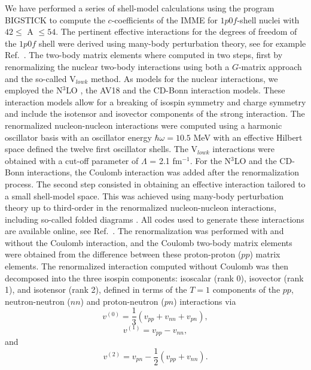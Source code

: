 \documentclass[twocolumn,aps,tightenlines,floatfix,showpacs]{revtex4}
\begin{document}
We have performed a series of shell-model calculations using the
program BIGSTICK to compute the $c$-coefficients of the IMME for
$1p0f$-shell nuclei with $ 42 \le $ A $ \le 54$. The pertinent
effective interactions for the degrees of freedom of the $1p0f$ shell
were derived using many-body perturbation theory, see for example
Ref.~\cite{mhj1995}. The two-body matrix elements where computed in
two steps, first by renormalizing the nuclear two-body interactions
using both a $G$-matrix approach and the so-called V$_{lowk}$
method. As models for the nuclear interactions, we employed the
N$^3$LO \cite{entem2003}, the AV18 \cite{argonne1995} and the CD-Bonn
\cite{cdbonn2001} interaction models. These interaction models allow
for a breaking of isospin symmetry and charge symmetry and include the
isotensor and isovector components of the strong interaction.  The
renormalized nucleon-nucleon interactions were computed using a
harmonic oscillator basis with an oscillator energy $\hbar\omega
=10.5$ MeV with an effective Hilbert space defined the twelve first
oscillator shells. The V$_{lowk}$ interactions were obtained with a
cut-off parameter of $\Lambda$ = 2.1 fm$^{-1}$.  For the N$^3$LO and
the CD-Bonn interactions, the Coulomb interaction was added after the
renormalization process.  The second step consisted in obtaining an
effective interaction tailored to a small shell-model space. This was
achieved using many-body perturbation theory up to third-order in the
renormalized nucleon-nucleon interactions, including so-called folded
diagrams \cite{mhj1995}. All codes used to generate these interactions
are available online, see Ref.~\cite{mhjgit}.  The renormalization was
performed with and without the Coulomb interaction, and the Coulomb
two-body matrix elements were obtained from the difference between
these proton-proton ($pp$) matrix elements. The renormalized
interaction computed without Coulomb was then decomposed into the
three isospin components: isoscalar (rank 0), isovector (rank 1), and
isotensor (rank 2), defined in terms of the $T=1$ components of the
$pp $, neutron-neutron ($nn$) and proton-neutron ($pn$) interactions
via
\[
v^{(0)}  =  \frac{1}{3} \left(v_{pp} + v_{nn} + v_{pn}\right),
\]
\[
v^{(1)}  =  v_{pp} - v_{nn},
\]
and
\[
v^{(2)}  =  v_{pn} - \frac{1}{2}(v_{pp} + v_{nn}).
\]
\end{document}
